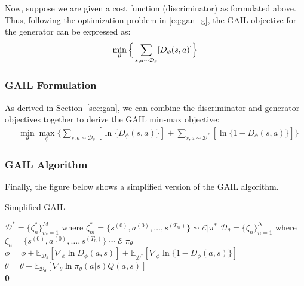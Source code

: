 \documentclass[11pt]{article}
\begin{document}
Now, suppose we are given a cost function (discriminator) as formulated above. Thus, following the optimization problem in \eqref{eq:gan_g}, the GAIL objective for the generator can be expressed as:
\begin{equation}
    \label{eq:gail_g}
    \min_{\theta} \Big\{ 
    \sum\limits_{s,a \sim \mathcal{D}_\theta} [D_{\phi}(s, a)] \Big\} \\
\end{equation}

\subsubsection{GAIL Formulation}

As derived in Section~\ref{sec:gan}, we can combine the discriminator and generator objectives together to derive the GAIL min-max objective:
\begin{align}
    \label{eq:gail}
    &\min_\theta \max_{\phi} \Big\{ 
    \sum\limits_{s, a\sim \mathcal{D}_\theta} [\ln \{D_{\phi}(s, a)\}] +
    \sum\limits_{s, a\sim \mathcal{D}^\ast} [\ln\{1 - D_{\phi}(s, a)\}] \Big\}
\end{align}

\subsubsection{GAIL Algorithm}

Finally, the figure below shows a simplified version of the GAIL algorithm.

\begin{algorithm}[H]
    \label{algo:gail}
    \caption{Simplified GAIL}
    \begin{algorithmic}[1]
    \State $\mathcal{D}^\ast = \{ \zeta^\ast_n\}_{m=1}^M$ where $\zeta_m^\ast = \{ s^{(0)}, a^{(0)}, \dots, s^{(T_m)} \} \sim \mathcal{E} | \pi^\ast$  
    \State $\mathcal{D}_\theta = \{ \zeta_n\}_{n=1}^N$ where $\zeta_n = \{s^{(0)}, a^{(0)}, \dots, s^{(T_n)} \} \sim \mathcal{E} | \pi_\theta$
    \State $\phi = \phi + \mathbb{E}_{\mathcal{D}_\theta} [\nabla_\phi \ln{D_\phi}(a, s)] + \mathbb{E}_{\mathcal{D}^\ast}[\nabla_\phi \ln \{1 - D_\phi(a, s)\}]$
    \State $\theta = \theta - \mathbb{E}_{\mathcal{D}_\theta}[\nabla_\theta \ln{\pi_\theta (a | s) Q(a, s)}]$
    \EndFor \\
    \Return $\boldsymbol{\theta}$
    \EndFunction
    \end{algorithmic}
\end{algorithm}
\end{document}
